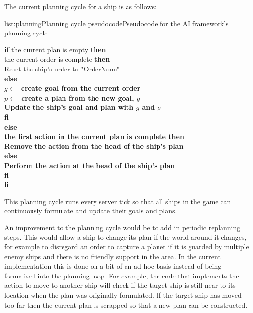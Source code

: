 The current planning cycle for a ship is as follows:

\vspace{-0.5em}
\begin{listing}{list:planning}{Planning cycle pseudocode}{Pseudocode for the AI framework's planning cycle.}{}
\end{listing}\vspace{-1.5em}

\begin{tabbing}
{\bf if} the current plan is empty {\bf then} \\
 the current order is complete {\bf then} \\
\quad\quad Reset the ship's order to "OrderNone" \\
\quad\bf else \\
\quad\quad $g \leftarrow$ create goal from the current order \\
\quad\quad $p \leftarrow$ create a plan from the new goal, $g$ \\
\quad\quad Update the ship's goal and plan with $g$ and $p$ \\
\quad\bf fi \\
\bf else \\
 the first action in the current plan is complete {\bf then} \\
\quad\quad Remove the action from the head of the ship's plan \\
\quad\bf else \\
\quad\quad Perform the action at the head of the ship's plan \\
\quad\bf fi \\
\bf fi
\end{tabbing}
\noindent
This planning cycle runs every server tick so that all ships in the game can
continuously formulate and update their goals and plans.

An improvement to the planning cycle would be to add in periodic replanning steps.
This would allow a ship to change its plan if the world around it changes, for example
to disregard an order to capture a planet if it is guarded by multiple enemy ships
and there is no friendly support in the area. In the current implementation this is
done on a bit of an ad-hoc basis instead of being formalised into the planning loop.
For example, the code that implements the action to move to another ship will check
if the target ship is still near to its location when the plan was originally formulated.
If the target ship has moved too far then the current plan is scrapped so that a new
plan can be constructed.

